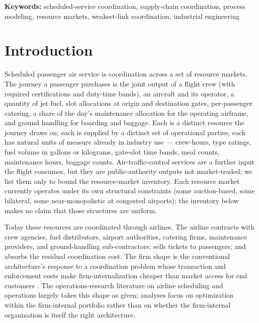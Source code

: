 \documentclass[11pt,a4paper]{article}
\theoremstyle{definition}
\theoremstyle{remark}
\begin{document}
\medskip
\noindent\textbf{Keywords:}
scheduled-service coordination, supply-chain coordination,
process modeling, resource markets, weakest-link coordination,
industrial engineering

\section{Introduction}
\label{sec:intro}

Scheduled passenger air service is coordination across a set of
resource markets. The journey a passenger purchases is the joint
output of a flight crew (with required certifications and
duty-time bands), an aircraft and its operator, a quantity of
jet fuel, slot allocations at origin and destination gates,
per-passenger catering, a share of the day's maintenance
allocation for the operating airframe, and ground handling for
boarding and baggage. Each is a distinct resource the journey
draws on; each is supplied by a distinct set of operational
parties; each has natural units of measure already in industry
use --- crew-hours, type ratings, fuel volume in gallons or
kilograms, gate-slot time bands, meal counts, maintenance hours,
baggage counts. Air-traffic-control services are a further input
the flight consumes, but they are public-authority outputs not
market-traded; we list them only to bound the resource-market
inventory. Each resource market currently operates under its own
structural constraints (some auction-based, some bilateral, some
near-monopolistic at congested airports); the inventory below
makes no claim that those structures are uniform.

Today these resources are coordinated through airlines.
The airline contracts with crew agencies, fuel distributors,
airport authorities, catering firms, maintenance providers, and
ground-handling sub-contractors; sells tickets to passengers; and
absorbs the residual coordination cost. The firm shape is the
conventional architecture's response to a coordination problem
whose transaction and enforcement costs make firm-internalization
cheaper than market access for end customers
\citep{williamson1985}. The operations-research literature on
airline scheduling and operations
\citep{barnhart_cohn_2004,ball_etal_2007,lan_clarke_barnhart_2006}
largely takes this shape as given; analyses focus on optimization
within the firm-internal portfolio rather than on whether the
firm-internal organization is itself the right architecture.
\end{document}
